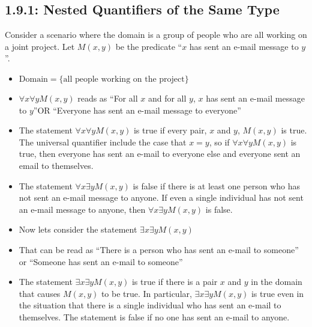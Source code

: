 \documentclass{article}
\begin{document}
\subsection*{1.9.1: Nested Quantifiers of the Same Type}
Consider a scenario where the domain is a group of people who are all working on a joint project. Let $M(x,y)$ be the predicate
``$x$ has sent an e-mail message to $y$''. 
\begin{itemize}
    \item $\text{Domain} = \{ \text{all people working on the project} \}$
    \item $\forall x \forall y M(x,y)$ reads as ``For all $x$ and for all $y$, $x$ has sent an e-mail message to $y$''OR ``Everyone has sent an e-mail message to everyone''
    \item The statement $\forall x \forall y M(x,y)$ is true if every pair, $x$ and $y$, $M(x,y)$ is true. The universal quantifier include the case that $x = y$, so if $\forall x \forall y M(x,y)$ is true, then everyone has sent an e-mail
    to everyone else and everyone sent an email to themselves.
    \item The statement $\forall x \exists y M(x,y)$ is false if there is at least one person who has not sent an e-mail message to anyone. If even a single individual has not sent an e-mail message to anyone, then $\forall x \exists y M(x,y)$ is false.
    \item Now lets consider the statement $\exists x \exists y M(x,y)$
    \item That can be read as ``There is a person who has sent an e-mail to someone'' or ``Someone has sent an e-mail to someone''
    \item The statement $\exists x \exists y M(x,y)$ is true if there is a pair $x$ and $y$  in the domain that causes $M(x,y)$ to be true. In particular, $\exists x \exists y M(x,y)$ is true even in the situation that there is a single individual who
    has sent an e-mail to themselves. The statement is false if no one has sent an e-mail to anyone.    

\end{itemize}
\end{document}
